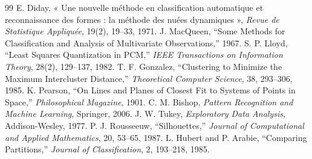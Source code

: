 \documentclass[12pt,a4paper]{article}
\begin{document}
\begin{thebibliography}{99}
 E. Diday, « Une nouvelle méthode en classification automatique et reconnaissance des formes : la méthode des nuées dynamiques », \emph{Revue de Statistique Appliquée}, 19(2), 19--33, 1971.
 J. MacQueen, “Some Methods for Classification and Analysis of Multivariate Observations,” 1967.
 S. P. Lloyd, “Least Squares Quantization in PCM,” \emph{IEEE Transactions on Information Theory}, 28(2), 129--137, 1982.
 T. F. Gonzalez, “Clustering to Minimize the Maximum Intercluster Distance,” \emph{Theoretical Computer Science}, 38, 293--306, 1985.
 K. Pearson, “On Lines and Planes of Closest Fit to Systems of Points in Space,” \emph{Philosophical Magazine}, 1901.
 C. M. Bishop, \emph{Pattern Recognition and Machine Learning}, Springer, 2006.
 J. W. Tukey, \emph{Exploratory Data Analysis}, Addison-Wesley, 1977.
 P. J. Rousseeuw, “Silhouettes,” \emph{Journal of Computational and Applied Mathematics}, 20, 53--65, 1987.
 L. Hubert and P. Arabie, “Comparing Partitions,” \emph{Journal of Classification}, 2, 193--218, 1985.
\end{thebibliography}
\end{document}
